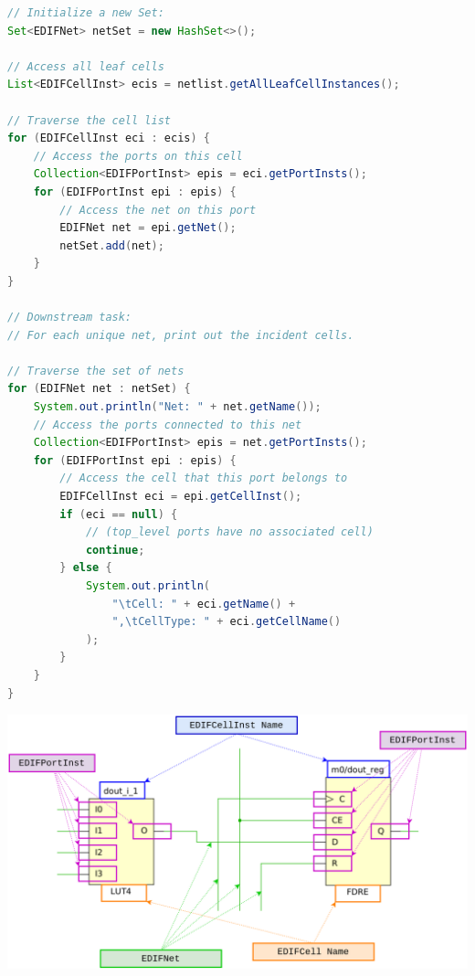 \begin{multicols}{2}
\begin{lstlisting}[language=java, caption={Netlist extraction and traversal}, label={lst:netlist_extract}]
// Initialize a new Set:
Set<EDIFNet> netSet = new HashSet<>();

// Access all leaf cells
List<EDIFCellInst> ecis = netlist.getAllLeafCellInstances();

// Traverse the cell list
for (EDIFCellInst eci : ecis) {
    // Access the ports on this cell
    Collection<EDIFPortInst> epis = eci.getPortInsts();
    for (EDIFPortInst epi : epis) {
        // Access the net on this port
        EDIFNet net = epi.getNet();
        netSet.add(net);
    }
}

// Downstream task:
// For each unique net, print out the incident cells.

// Traverse the set of nets
for (EDIFNet net : netSet) {
    System.out.println("Net: " + net.getName());
    // Access the ports connected to this net
    Collection<EDIFPortInst> epis = net.getPortInsts();
    for (EDIFPortInst epi : epis) {
        // Access the cell that this port belongs to
        EDIFCellInst eci = epi.getCellInst();
        if (eci == null) {
            // (top_level ports have no associated cell)
            continue;
        } else {
            System.out.println(
                "\tCell: " + eci.getName() + 
                ",\tCellType: " + eci.getCellName()
            );
        }
    }
}
\end{lstlisting}

{
    \centering
    \includegraphics[valign=c, width=\columnwidth]{figures/traversal.png}
    \label{fig:traversal}
}
\vspace{0.5cm}


\end{multicols}

